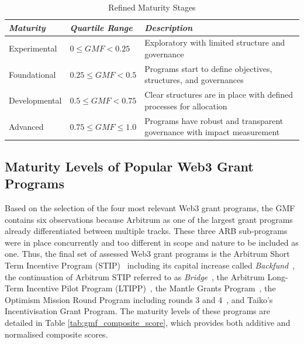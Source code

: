 \documentclass[conference]{IEEEtran}
\begin{document}
\begin{table}[htbp]
\caption{Refined Maturity Stages}
\centering
\footnotesize
\begin{tabular}{p{1.5cm}p{2.5cm}p{3.5cm}}
\hline
\textbf{\textit{Maturity}} & \textbf{\textit{Quartile Range}} & \textbf{\textit{Description}} \\
\hline
Experimental & \( 0 \leq GMF < 0.25 \) & Exploratory with limited structure and governance \\
Foundational & \( 0.25 \leq GMF < 0.5 \) & Programs start to define objectives, structures, and governances \\
Developmental & \( 0.5 \leq GMF < 0.75 \) & Clear structures are in place with defined processes for allocation \\
Advanced & \( 0.75 \leq GMF \leq 1.0 \) & Programs have robust and transparent governance with impact measurement \\
\hline
\end{tabular}
\label{tab:revised_maturity_stages}
\end{table}

\subsection{Maturity Levels of Popular Web3 Grant Programs}\label{sec_4.2}

Based on the selection of the four most relevant Web3 grant programs, the GMF contains six observations because Arbitrum as one of the largest grant programs already differentiated between multiple tracks. These three ARB sub-programs were in place concurrently and too different in scope and nature to be included as one. Thus, the final set of assessed Web3 grant programs is the Arbitrum Short Term Incentive Program (STIP)~\cite{tnorm_arbitrums_2023,arbitrum_dao_arbitrum_2023} including its capital increase called \textit{Backfund}~\cite{frisson_arbitrum_2023}, the continuation of Arbitrum STIP referred to as \textit{Bridge}~\cite{lumley_stip-bridge_2024,arbitrum_dao_double-down_2024}, the Arbitrum Long-Term Incentive Pilot Program (LTIPP)~\cite{stein_arbitrum_2024}, the Mantle Grants Program~\cite{bitdao_passed_2023}, the Optimism Mission Round Program including rounds 3 and 4~\cite{the_optimism_collective_what_2024}, and Taiko's Incentivisation Grant Program. The maturity levels of these programs are detailed in Table \ref{tab:gmf_composite_score}, which provides both additive and normalised composite scores.
\end{document}
